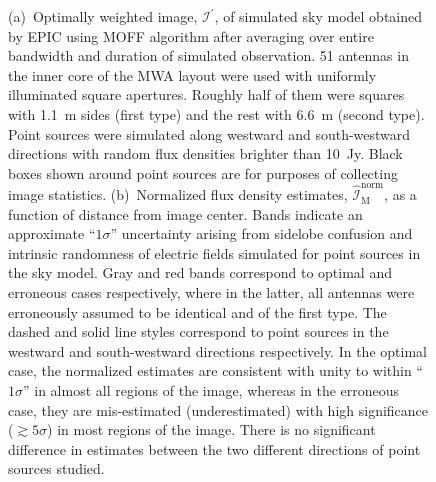 \documentclass[a4paper,fleqn,usenatbib]{mnras}
\begin{document}
\begin{figure}
\caption{(a)~Optimally weighted image, $\mathcal{I}^\prime$, of simulated sky model obtained by EPIC using MOFF algorithm after averaging over entire bandwidth and duration of simulated observation. 51 antennas in the inner core of the MWA layout were used with uniformly illuminated square apertures. Roughly half of them were squares with 1.1~m sides (first type) and the rest with 6.6~m (second type). Point sources were simulated along westward and south-westward directions with random flux densities brighter than 10~Jy. Black boxes shown around point sources are for purposes of collecting image statistics. (b)~Normalized flux density estimates, $\widehat{\mathcal{I}}_\textrm{M}^\textrm{norm}$, as a function of distance from image center. Bands indicate an approximate ``$1\sigma$'' uncertainty arising from sidelobe confusion and intrinsic randomness of electric fields simulated for point sources in the sky model. Gray and red bands correspond to optimal and erroneous cases respectively, where in the latter, all antennas were erroneously assumed to be identical and of the first type. The dashed and solid line styles correspond to point sources in the westward and south-westward directions respectively. In the optimal case, the normalized estimates are consistent with unity to within ``$1\sigma$'' in almost all regions of the image, whereas in the erroneous case, they are mis-estimated (underestimated) with high significance ($\gtrsim 5\sigma$) in most regions of the image. There is no significant difference in estimates between the two different directions of point sources studied.}
\label{fig:versatility}
\end{figure}
\end{document}
